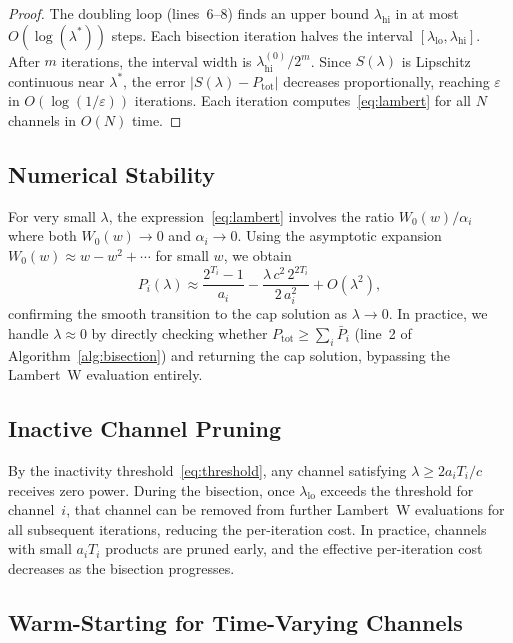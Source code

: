 \documentclass[journal]{IEEEtran}
\begin{document}
\begin{proof}
The doubling loop (lines~6--8) finds an upper bound $\lambda_{\mathrm{hi}}$ in at most $O(\log(\lambda^*))$ steps.
Each bisection iteration halves the interval $[\lambda_{\mathrm{lo}}, \lambda_{\mathrm{hi}}]$.
After $m$ iterations, the interval width is $\lambda_{\mathrm{hi}}^{(0)} / 2^m$.
Since $S(\lambda)$ is Lipschitz continuous near $\lambda^*$, the error $|S(\lambda) - P_{\mathrm{tot}}|$ decreases proportionally, reaching $\varepsilon$ in $O(\log(1/\varepsilon))$ iterations.
Each iteration computes~\eqref{eq:lambert} for all $N$ channels in $O(N)$ time.
\end{proof}

\subsection{Numerical Stability}

For very small $\lambda$, the expression~\eqref{eq:lambert} involves the ratio $W_0(w)/\alpha_i$ where both $W_0(w) \to 0$ and $\alpha_i \to 0$.
Using the asymptotic expansion $W_0(w) \approx w - w^2 + \cdots$ for small $w$, we obtain
\begin{equation}
P_i(\lambda) \approx \frac{2^{T_i} - 1}{a_i} - \frac{\lambda\, c^2\, 2^{2T_i}}{2\,a_i^2} + O(\lambda^2),
\end{equation}
confirming the smooth transition to the cap solution as $\lambda \to 0$.
In practice, we handle $\lambda \approx 0$ by directly checking whether $P_{\mathrm{tot}} \ge \sum_i \bar{P}_i$ (line~2 of Algorithm~\ref{alg:bisection}) and returning the cap solution, bypassing the Lambert~W evaluation entirely.

\subsection{Inactive Channel Pruning}

By the inactivity threshold~\eqref{eq:threshold}, any channel satisfying $\lambda \ge 2a_i T_i / c$ receives zero power.
During the bisection, once $\lambda_{\mathrm{lo}}$ exceeds the threshold for channel~$i$, that channel can be removed from further Lambert~W evaluations for all subsequent iterations, reducing the per-iteration cost.
In practice, channels with small $a_i T_i$ products are pruned early, and the effective per-iteration cost decreases as the bisection progresses.

\subsection{Warm-Starting for Time-Varying Channels}
\end{document}
